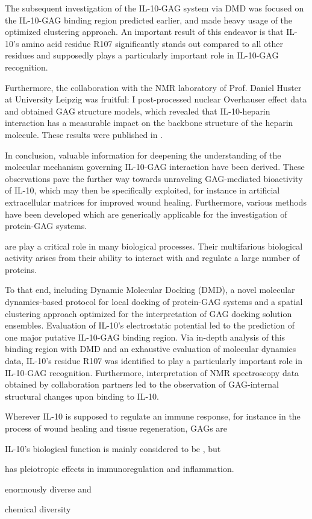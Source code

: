 The subsequent investigation of the IL-10-GAG system via DMD was focused on the
IL-10-GAG binding region predicted earlier, and made heavy usage of the
optimized clustering approach. An important result of this endeavor is that
IL-10's amino acid residue R107 significantly stands out compared to all other
residues and supposedly plays a particularly important role in IL-10-GAG
recognition.

Furthermore, the collaboration with the NMR laboratory of Prof. Daniel Huster at
University Leipzig was fruitful: I post-processed nuclear Overhauser effect data
and obtained GAG structure models, which revealed that IL-10-heparin interaction
has a measurable impact on the backbone structure of the heparin molecule. These
results were published in \cite{kuenze_gehrcke_2014}.

In conclusion, valuable information for deepening the understanding of the
molecular mechanism governing IL-10-GAG interaction have been derived. These
observations pave the further way towards unraveling GAG-mediated bioactivity of
IL-10, which may then be specifically exploited, for instance in artificial
extracellular matrices for improved wound healing. Furthermore, various methods
have been developed which are generically applicable for the investigation of
protein-GAG systems.

\vspace{2cm}

are play a critical role in many biological processes.
Their multifarious biological activity arises from their ability to interact
with and regulate a large number of proteins.

  To that end, including Dynamic Molecular Docking
(DMD), a novel molecular dynamics-based protocol for local docking of
protein-GAG systems and a spatial clustering approach optimized for the
interpretation of GAG docking solution ensembles. Evaluation of IL-10's
electrostatic potential led to the prediction of one major putative IL-10-GAG
binding region. Via in-depth analysis of this binding region with DMD and an
exhaustive evaluation of molecular dynamics data, IL-10's residue R107 was
identified to play a particularly important role in IL-10-GAG recognition.
Furthermore, interpretation of NMR spectroscopy data obtained by collaboration
partners led to the observation of GAG-internal structural changes upon binding
to IL-10.



Wherever IL-10 is supposed to
regulate an immune response, for instance in the process of wound healing and
tissue regeneration, GAGs are


 IL-10's biological function is mainly considered to be
, but

 has pleiotropic effects in immunoregulation and
inflammation.





enormously diverse and

chemical diversity


\lipsum[1-4]
